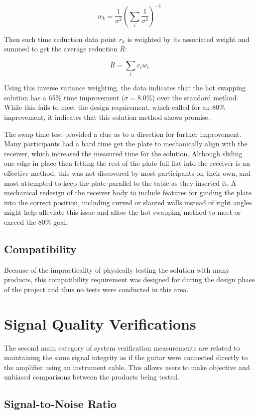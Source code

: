 		$$ w_k = \frac{1}{\sigma^2} \left( \sum_i \frac{1}{\sigma^2} \right)^{-1} $$

		Then each time reduction data point $r_k$ is weighted by its associated weight and summed to get the average reduction $\overline{R}$:

		$$ \overline{R} = \sum_i r_i w_i $$

		Using this inverse variance weighting, the data indicates that the hot swapping solution has a 65\% time improvement ($\sigma = 8.0\%$) over the standard method.  While this fails to meet the design requirement, which called for an 80\% improvement, it indicates that this solution method shows promise.

		The swap time test provided a clue as to a direction for further improvement.  Many participants had a hard time get the plate to mechanically align with the receiver, which increased the measured time for the solution.  Although sliding one edge in place then letting the rest of the plate fall flat into the receiver is an effective method, this was not discovered by most participants on their own, and most attempted to keep the plate parallel to the table as they inserted it.  A mechanical redesign of the receiver body to include features for guiding the plate into the correct position, including curved or slanted walls instead of right angles might help alleviate this issue and allow the hot swapping method to meet or exceed the 80\% goal.

	\subsection{Compatibility}

		Because of the impracticality of physically testing the solution with many products, this compatibility requirement was designed for during the design phase of the project and thus no tests were conducted in this area.

\section{Signal Quality Verifications}

The second main category of system verification measurements are related to maintaining the same signal integrity as if the guitar were connected directly to the amplifier using an instrument cable.  This allows users to make objective and unbiased comparisons between the products being tested.

	\subsection{Signal-to-Noise Ratio}
